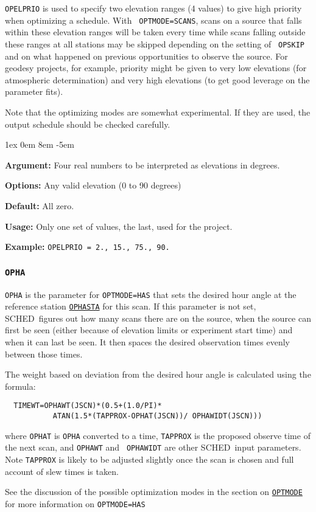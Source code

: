 \documentclass{report}
\newcommand{\schedb}{{\sc SCHED~}}
\newcommand{\rcwbox}[5]{
  \begin{list}{}{\parsep 1ex  \itemsep 0em
                 \leftmargin 8em  \itemindent -5em }
    \item {\bf Argument:} #1
    \item {\bf Options:}  #2
    \item {\bf Default:}  #3
    \item {\bf Usage:}    #4
    \item {\bf Example:}  #5
  \end{list}
}
\begin{document}
{\tt OPELPRIO} is used to specify two elevation ranges (4 values) to
give high priority when optimizing a schedule.  With {\tt
OPTMODE=SCANS}, scans on a source that falls within these elevation
ranges will be taken every time while scans falling outside these
ranges at all stations may be skipped depending on the setting of {\tt
OPSKIP} and on what happened on previous opportunities to observe the
source.  For geodesy projects, for example, priority might be given to
very low elevations (for atmospheric determination) and very high
elevations (to get good leverage on the parameter fits).

Note that the optimizing modes are somewhat experimental.  If they are
used, the output schedule should be checked carefully.

\rcwbox
{Four real numbers to be interpreted as elevations in degrees.}
{Any valid elevation (0 to 90 degrees)}
{All zero.}
{Only one set of values, the last, used for the project.}
{{\tt OPELPRIO = 2., 15., 75., 90.}}

\subsubsection{\label{MP:OPHA}{\tt OPHA}}

{\tt OPHA} is the parameter for {\tt OPTMODE=HAS} that sets the desired
hour angle at the reference station 
{\hyperref[MP:OPHASTA]{{\tt OPHASTA}}}
for this scan.  If this parameter is not set, \schedb figures out how
many scans there are on the source, when the source can first be
seen (either because of elevation limits or experiment start time) and
when it can last be seen.  It then spaces the desired observation times
evenly between those times.

The weight based on deviation from the desired hour angle is calculated
using the formula:
\begin{verbatim}
  TIMEWT=OPHAWT(JSCN)*(0.5+(1.0/PI)*
           ATAN(1.5*(TAPPROX-OPHAT(JSCN))/ OPHAWIDT(JSCN)))
\end{verbatim}
where {\tt OPHAT} is {\tt OPHA} converted to a time, {\tt TAPPROX} is the
proposed observe time of the next scan, and {\tt OPHAWT} and {\tt
OPHAWIDT} are other \schedb input parameters.  Note {\tt TAPPROX} is
likely to be adjusted slightly once the scan is chosen and full
account of slew times is taken.

See the discussion of the possible optimization modes in the section
on 
{\hyperref[MP:OPTMODE]{{\tt OPTMODE}}} for more information on
{\tt OPTMODE=HAS}
\end{document}
